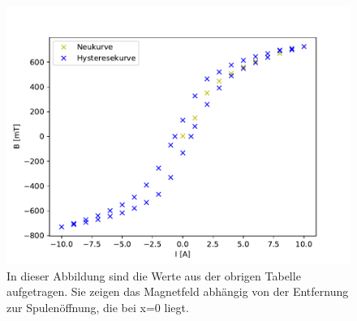 \documentclass[titlepage = firstcover]{scrartcl}
\begin{document}
        \begin{figure}[h]
            \centering
            \includegraphics{Hysterese.pdf}
            \caption{In dieser Abbildung sind die Werte aus der obrigen Tabelle aufgetragen. Sie zeigen das Magnetfeld abhängig von der Entfernung zur Spulenöffnung, die bei x=0 liegt.}
            \label{fig:Hysterese}

        \end{figure}

        \newpage
        
\end{document}
